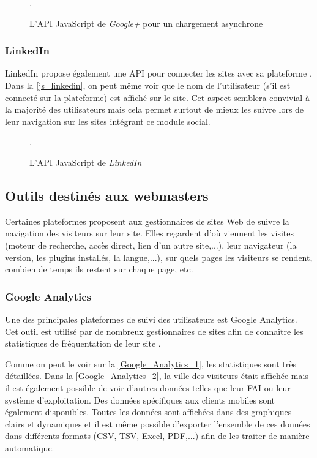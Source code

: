 \begin{figure}[h]
	\centering
	
	\caption{\label{js_google_plus_async}L'API JavaScript de \textit{Google+} pour un chargement asynchrone}.
\end{figure}

\subsubsection{LinkedIn}
LinkedIn propose également une API pour connecter les sites avec sa plateforme \cite{javascript_linkedin}. Dans la \autoref{js_linkedin}, on peut même voir que le nom de l'utilisateur (s'il est connecté sur la plateforme) est affiché sur le site. Cet aspect semblera convivial à la majorité des utilisateurs mais cela permet surtout de mieux les suivre lors de leur navigation sur les sites intégrant ce module social.

\begin{figure}[h]
	\centering
	
	\caption{\label{js_linkedin}L'API JavaScript de \textit{LinkedIn}}.
\end{figure}

\subsection{Outils destinés aux webmasters}
Certaines plateformes proposent aux gestionnaires de sites Web de suivre la navigation des visiteurs sur leur site. Elles regardent d'où viennent les visites (moteur de recherche, accès direct, lien d'un autre site,...), leur navigateur (la version, les plugins installés, la langue,...), sur quels pages les visiteurs se rendent, combien de temps ils restent sur chaque page, etc.

\subsubsection{Google Analytics}
\label{google_analytics}
Une des principales plateformes de suivi des utilisateurs est Google Analytics. Cet outil est utilisé par de nombreux gestionnaires de sites afin de connaître les statistiques de fréquentation de leur site \cite{javascript_google_analytics}.

Comme on peut le voir sur la \autoref{Google_Analytics_1}, les statistiques sont très détaillées. Dans la \autoref{Google_Analytics_2}, la ville des visiteurs était affichée mais il est également possible de voir d'autres données telles que leur FAI ou leur système d'exploitation. Des données spécifiques aux clients mobiles sont également disponibles. Toutes les données sont affichées dans des graphiques clairs et dynamiques et il est même possible d'exporter l'ensemble de ces données dans différents formats (CSV, TSV, Excel, PDF,...) afin de les traiter de manière automatique.


